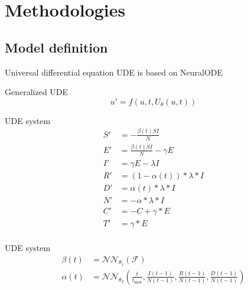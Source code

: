 \section{Methodologies}

\subsection{Model definition}

\begin{frame}[allowframebreaks]{Universal differential equation}
    \gls{UDE} \cite{rackauckasUniversalDifferentialEquations2020} is based on \gls{NeuralODE}

    \begin{block}{Generalized \gls{UDE}}
        \begin{equation*}
            u' = f(u, t, U_\theta(u, t))
        \end{equation*}
    \end{block}

    \framebreak

    \begin{block}{UDE system}
        \begin{equation*}
            \begin{aligned}
                S' &= - \frac{\beta(t) SI}{N} \\
                E' &= \frac{\beta(t) SI}{N} - \gamma E \\
                I' &= \gamma E - \lambda I \\
                R' &= (1 - \alpha(t)) * \lambda * I \\
                D' &= \alpha(t) * \lambda * I \\
                N' &= - \alpha * \lambda * I \\
                C' &= -C + \gamma * E \\
                T' &= \gamma * E \\
            \end{aligned}
        \end{equation*}
    \end{block}

    \framebreak

    \begin{block}{UDE system}
        \begin{equation*}
            \begin{aligned}
                \beta(t) &= \mathcal{NN}_{\theta_1}(\mathcal{F}) \\
                \alpha(t) &= \mathcal{NN}_{\theta_2} (\frac{t}{t_\text{max}}, \frac{I(t-1)}{N(t-1)}, \frac{R(t-1)}{N(t-1)}, \frac{D(t-1)}{N(t-1)})
            \end{aligned}
        \end{equation*}
    \end{block}


\end{frame}

